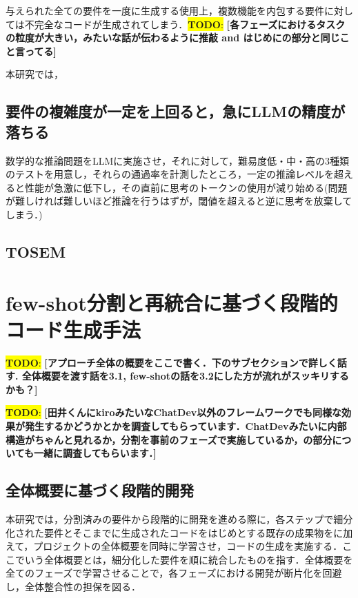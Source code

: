 \documentclass[submit,techrep,noauthor]{ipsj}
\newcommand{\todo}[1]{\colorbox{yellow}{{\bf TODO}:}{\color{red} {\textbf{[#1]}}}}
\begin{document}
与えられた全ての要件を一度に生成する使用上，複数機能を内包する要件に対しては不完全なコードが生成されてしまう．\todo{各フェーズにおけるタスクの粒度が大きい，みたいな話が伝わるように推敲 and はじめにの部分と同じこと言ってる}

本研究では，


\subsection{要件の複雑度が一定を上回ると，急にLLMの精度が落ちる}

数学的な推論問題をLLMに実施させ，それに対して，難易度低・中・高の3種類のテストを用意し，それらの通過率を計測したところ，一定の推論レベルを超えると性能が急激に低下し，その直前に思考のトークンの使用が減り始める(問題が難しければ難しいほど推論を行うはずが，閾値を超えると逆に思考を放棄してしまう．)\cite{IllusionApple}


\subsection{TOSEM}




\section{few-shot分割と再統合に基づく段階的コード生成手法}

\todo{アプローチ全体の概要をここで書く．下のサブセクションで詳しく話す. 全体概要を渡す話を3.1, few-shotの話を3.2にした方が流れがスッキリするかも？}

\todo{田井くんにkiroみたいなChatDev以外のフレームワークでも同様な効果が発生するかどうかとかを調査してもらっています．ChatDevみたいに内部構造がちゃんと見れるか，分割を事前のフェーズで実施しているか，の部分についても一緒に調査してもらいます．}

\subsection{全体概要に基づく段階的開発}
本研究では，分割済みの要件から段階的に開発を進める際に，各ステップで細分化された要件とそこまでに生成されたコードをはじめとする既存の成果物をに加えて，プロジェクトの全体概要を同時に学習させ，コードの生成を実施する．ここでいう全体概要とは，細分化した要件を順に統合したものを指す．全体概要を全てのフェーズで学習させることで，各フェーズにおける開発が断片化を回避し，全体整合性の担保を図る．
\end{document}
